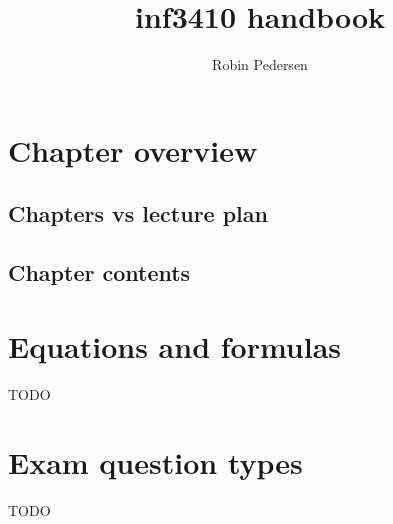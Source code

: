 \documentclass[twocolumn]{article}
\begin{document}
  \title{inf3410 handbook}
  \author{Robin Pedersen}
  \maketitle
  \tableofcontents

  
  \section{Chapter overview}
    
    \subsection{Chapters vs lecture plan}
      
    \subsection{Chapter contents}
      
  \section{Equations and formulas}
    TODO
  \section{Exam question types}
    TODO
  \printindex
\end{document}
